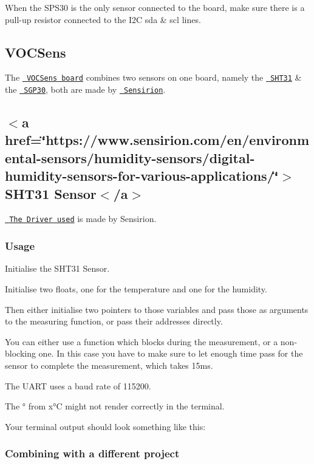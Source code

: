 When the S\+P\+S30 is the only sensor connected to the board, make sure there is a pull-\/up resistor connected to the I2C sda \& scl lines.\hypertarget{autotoc_md7_autotoc_md16}{}\subsection{V\+O\+C\+Sens}\label{autotoc_md7_autotoc_md16}
The \href{https://www.glyn.de/Produkte/Sensoren/VOCSens}{\texttt{ V\+O\+C\+Sens board}} combines two sensors on one board, namely the \href{https://www.sensirion.com/en/environmental-sensors/humidity-sensors/digital-humidity-sensors-for-various-applications/}{\texttt{ S\+H\+T31}} \& the \href{https://www.sensirion.com/de/umweltsensoren/gassensoren/multipixel-gassensoren/}{\texttt{ S\+G\+P30}}, both are made by \href{https://www.sensirion.com/en/}{\texttt{ Sensirion}}.\hypertarget{autotoc_md7_autotoc_md17}{}\subsection{$<$a href=\char`\"{}https\+://www.\+sensirion.\+com/en/environmental-\/sensors/humidity-\/sensors/digital-\/humidity-\/sensors-\/for-\/various-\/applications/\char`\"{}$>$\+S\+H\+T31 Sensor$<$/a$>$}\label{autotoc_md7_autotoc_md17}
\href{https://github.com/Sensirion/embedded-sht}{\texttt{ The Driver used}} is made by Sensirion.\hypertarget{autotoc_md7_autotoc_md18}{}\subsubsection{Usage}\label{autotoc_md7_autotoc_md18}
Initialise the S\+H\+T31 Sensor.

Initialise two floats, one for the temperature and one for the humidity.

Then either initialise two pointers to those variables and pass those as arguments to the measuring function, or pass their addresses directly.

You can either use a function which blocks during the measurement, or a non-\/blocking one. In this case you have to make sure to let enough time pass for the sensor to complete the measurement, which takes 15ms.

The U\+A\+RT uses a baud rate of 115200.

The ° from x°C might not render correctly in the terminal.

Your terminal output should look something like this\+: 
\begin{DoxyCode}{0}
\end{DoxyCode}
\hypertarget{autotoc_md7_autotoc_md19}{}\subsubsection{Combining with a different project}\label{autotoc_md7_autotoc_md19}

